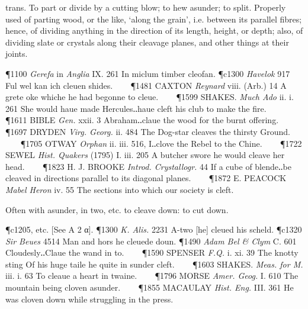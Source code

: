 \begin{description}[wide, labelwidth=!, labelindent=0pt]
\begin{myenumerate}





 trans. To part or divide by a cutting blow; to hew asunder; to split. Properly used of parting wood, or the like, ‘along the grain’, i.e. between its parallel fibres; hence, of dividing anything in the direction of its length, height, or depth; also, of dividing slate or crystals along their cleavage planes, and other things at their joints.

\P 1100 \textit{Gerefa} in  \textit{Anglia} IX. 261 In miclum  timber cleofan.
\P c1300  \textit{Havelok} 917 Ful wel kan ich cleuen shides.    
\P 1481 CAXTON  \textit{Reynard} viii. (Arb.) 14 A grete oke whiche he had begonne to cleue.    
\P 1599 SHAKES.  \textit{Much Ado} ii. i. 261 She would haue made Hercules‥haue cleft his club to make the fire.    
\P 1611 BIBLE  \textit{Gen.} xxii. 3 Abraham‥claue the wood for the burnt offering.    
\P 1697 DRYDEN  \textit{Virg. Georg.} ii. 484 The Dog-star cleaves the thirsty Ground.    
\P 1705 OTWAY  \textit{Orphan} ii. iii. 516, I‥clove the Rebel to the Chine.    
\P 1722 SEWEL  \textit{Hist. Quakers} (1795) I. iii. 205 A butcher swore he would cleave her head.    
\P 1823 H. J. BROOKE  \textit{Introd. Crystallogr.} 44 If a cube of blende‥be cleaved in directions parallel to its diagonal planes.    
\P 1872 E. PEACOCK  \textit{Mabel Heron} iv. 55 The sections into which our society is cleft.

 Often with asunder, in two, etc. to cleave down: to cut down.

\P c1205, etc. [See A 2 α].
\P 1300 \textit{K. Alis.}  2231 A-two [he] cleued his scheld.
\P c1320 \textit{Sir Beues}  4514 Man and hors he cleuede doun.
\P 1490 \textit{Adam  Bel \& Clym} C. 601 Cloudesly‥Claue the wand in to.    
\P 1590 SPENSER  \textit{F.Q.} i. xi. 39 The knotty sting Of his huge taile he quite in sunder cleft.    
\P 1603 SHAKES.  \textit{Meas. for M.} iii. i. 63 To cleaue a heart in twaine.    
\P 1796 MORSE  \textit{Amer. Geog.} I. 610 The mountain being cloven asunder.    
\P 1855 MACAULAY  \textit{Hist. Eng.} III. 361 He was cloven down while struggling in the press.


\end{myenumerate}
\end{description}
